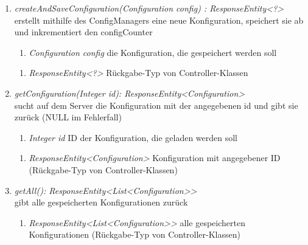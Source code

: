 \begin{enumerate}[+]
	\item \textit{ createAndSaveConfiguration(Configuration config) : ResponseEntity<?> } \\
	erstellt mithilfe des ConfigManagers eine neue Konfiguration, speichert sie ab und inkrementiert den configCounter
	
	\begin{enumerate}[$\bullet$]
		\item \textit{Configuration config} die Konfiguration, die gespeichert werden soll
	\end{enumerate}
	\vspace{-0.2cm}
	\begin{enumerate}[$\circ$]
		\item \textit{ResponseEntity<?>} Rückgabe-Typ von Controller-Klassen
	\end{enumerate}
	
		\item \textit{ getConfiguration(Integer id): ResponseEntity<Configuration> }\\
		sucht auf dem Server die Konfiguration mit der angegebenen id und gibt sie zurück (NULL im Fehlerfall)
	
	\begin{enumerate}[$\bullet$]
		\item \textit{Integer id} ID der Konfiguration, die geladen werden soll
		
	\end{enumerate}
	\vspace{-0.2cm}
	\begin{enumerate}[$\circ$]
		\item \textit{ResponseEntity<Configuration>} Konfiguration mit angegebener ID (Rückgabe-Typ von Controller-Klassen)
	\end{enumerate}
	\item \textit{ getAll(): ResponseEntity<List<Configuration>> }\\
	gibt alle gespeicherten Konfigurationen zurück
	
	\begin{enumerate}[$\circ$]
		\item \textit{ResponseEntity<List<Configuration>>} alle gespeicherten Konfigurationen (Rückgabe-Typ von Controller-Klassen)
	\end{enumerate}
\end{enumerate}